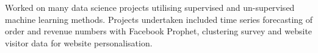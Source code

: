 Worked on many data science projects utilising supervised and un-supervised machine learning methods.
Projects undertaken included time series forecasting of order and revenue numbers with Facebook Prophet, clustering survey and website visitor data for website personalisation.